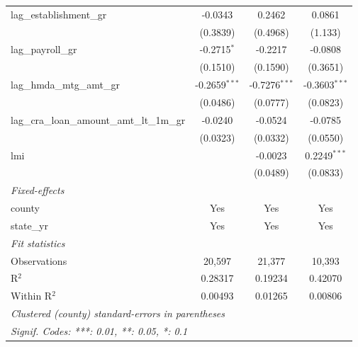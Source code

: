 \begin{tabular}{lccc}
   lag\_establishment\_gr                         & -0.0343                 & 0.2462          & 0.0861\\   
                                                  & (0.3839)                & (0.4968)        & (1.133)\\   
   lag\_payroll\_gr                               & -0.2715$^{*}$           & -0.2217         & -0.0808\\   
                                                  & (0.1510)                & (0.1590)        & (0.3651)\\   
   lag\_hmda\_mtg\_amt\_gr                        & -0.2659$^{***}$         & -0.7276$^{***}$ & -0.3603$^{***}$\\   
                                                  & (0.0486)                & (0.0777)        & (0.0823)\\   
   lag\_cra\_loan\_amount\_amt\_lt\_1m\_gr        & -0.0240                 & -0.0524         & -0.0785\\   
                                                  & (0.0323)                & (0.0332)        & (0.0550)\\   
   lmi                                            &                         & -0.0023         & 0.2249$^{***}$\\   
                                                  &                         & (0.0489)        & (0.0833)\\   
   \midrule
   \emph{Fixed-effects}\\
   county                                         & Yes                     & Yes             & Yes\\  
   state\_yr                                      & Yes                     & Yes             & Yes\\  
   \midrule
   \emph{Fit statistics}\\
   Observations                                   & 20,597                  & 21,377          & 10,393\\  
   R$^2$                                          & 0.28317                 & 0.19234         & 0.42070\\  
   Within R$^2$                                   & 0.00493                 & 0.01265         & 0.00806\\  
   \midrule \midrule
   \multicolumn{4}{l}{\emph{Clustered (county) standard-errors in parentheses}}\\
   \multicolumn{4}{l}{\emph{Signif. Codes: ***: 0.01, **: 0.05, *: 0.1}}\\
\end{tabular}
\par\endgroup
